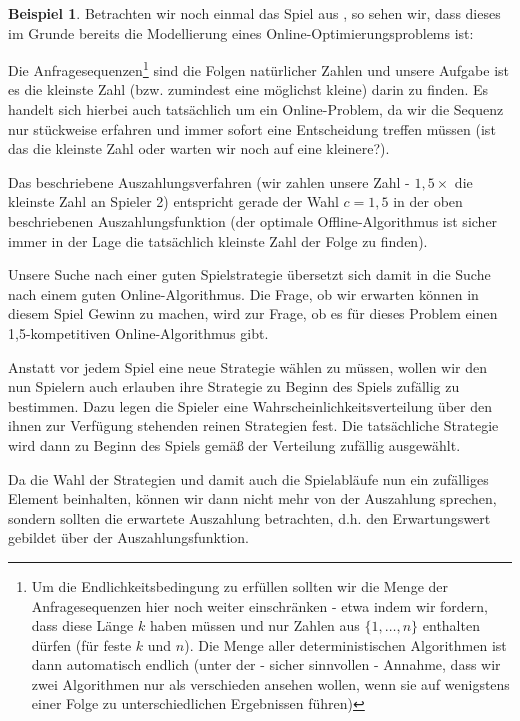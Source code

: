 \documentclass[a4paper,ngerman,12pt,bibtotoc]{scrartcl}
\theoremstyle{definition}
\newtheorem{bsp}[defn]{Beispiel}
\theoremstyle{plain}
\theoremstyle{remark}
\renewcommand{\_}{\mathpunct{.}\,}
\newcommand{\?}{\,{:}\,}
\begin{document}
	\begin{bsp}\label{bsp:Teil2}
		Betrachten wir noch einmal das Spiel aus , so sehen wir, dass dieses im Grunde bereits die Modellierung eines Online-Optimierungsproblems ist: 
		
		Die Anfragesequenzen\footnote{Um die Endlichkeitsbedingung zu erfüllen sollten wir die Menge der Anfragesequenzen hier noch weiter einschränken - etwa indem wir fordern, dass diese Länge $k$ haben müssen und nur Zahlen aus $\{1, \dots, n\}$ enthalten dürfen (für feste $k$ und $n$). Die Menge aller deterministischen Algorithmen ist dann automatisch endlich (unter der - sicher sinnvollen - Annahme, dass wir zwei Algorithmen nur als verschieden ansehen wollen, wenn sie auf wenigstens einer Folge zu unterschiedlichen Ergebnissen führen)} sind die Folgen natürlicher Zahlen und unsere Aufgabe ist es die kleinste Zahl (bzw. zumindest eine möglichst kleine) darin zu finden. Es handelt sich hierbei auch tatsächlich um ein Online-Problem, da wir die Sequenz nur stückweise erfahren und immer sofort eine Entscheidung treffen müssen (ist das die kleinste Zahl oder warten wir noch auf eine kleinere?).
		
		Das beschriebene Auszahlungsverfahren (wir zahlen unsere Zahl - $1,5\times$ die kleinste Zahl an Spieler 2) entspricht gerade der Wahl $c=1,5$ in der oben beschriebenen Auszahlungsfunktion (der optimale Offline-Algorithmus ist sicher immer in der Lage die tatsächlich kleinste Zahl der Folge zu finden).
		
		Unsere Suche nach einer guten Spielstrategie übersetzt sich damit in die Suche nach einem guten Online-Algorithmus. Die Frage, ob wir erwarten können in diesem Spiel Gewinn zu machen, wird zur Frage, ob es für dieses Problem einen 1,5-kompetitiven Online-Algorithmus gibt.
	\end{bsp}
	
	Anstatt vor jedem Spiel eine neue Strategie wählen zu müssen, wollen wir den nun Spielern auch erlauben ihre Strategie zu Beginn des Spiels zufällig zu bestimmen. Dazu legen die Spieler eine Wahrscheinlichkeitsverteilung über den ihnen zur Verfügung stehenden reinen Strategien fest. Die tatsächliche Strategie wird dann zu Beginn des Spiels gemäß der Verteilung zufällig ausgewählt.
	
	Da die Wahl der Strategien und damit auch die Spielabläufe nun ein zufälliges Element beinhalten, können wir dann nicht mehr von \glqq der Auszahlung\grqq{} sprechen, sondern sollten die erwartete Auszahlung betrachten, d.h. den Erwartungswert gebildet über der Auszahlungsfunktion.
	
\end{document}
